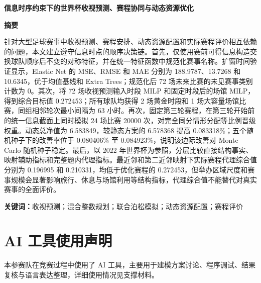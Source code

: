 \documentclass[UTF8,a4paper,11pt,fontset=none]{ctexart}
\begin{document}
\setcounter{page}{1}

\begin{center}
  {\bfseries 信息时序约束下的世界杯收视预测、赛程协同与动态资源优化\par}
\end{center}
\vspace{0.8em}

\begin{center}
  {\bfseries 摘\quad 要}
\end{center}

针对大型足球赛事中收视预测、赛程安排、动态资源配置和实际赛程评价相互依赖的问题，本文建立遵守信息时点的顺序决策链。首先，仅使用赛前可得信息构造交换球队顺序后不变的对称特征，并在统一特征函数中规范化赛事名称。扩窗时间验证显示，Elastic Net 的 MSE、RMSE 和 MAE 分别为 188.9787、13.7268 和 10.6345，优于均值基线和 Extra Trees；规范化后 72 场未来比赛的未见赛事类别计数为 0。其次，将 72 场收视预测输入时段 MILP 和固定时段后的场馆 MILP，得到综合目标值 0.272453；所有球队均获得 2 场黄金时段和 1 场大容量场馆比赛，同组相邻轮次最小间隔为 63 小时。再次，固定第三轮赛程，在第三轮开始前的统一信息截面上同时模拟 24 场比赛 20000 次，对完全同分情形分配等比例晋级权重。动态总净值为 6.583849，较静态方案的 6.578368 提高 0.083318\%；五个随机种子下的改善率位于 0.080406\% 至 0.084923\%，说明该边际改善对 Monte Carlo 随机种子稳定。最后，以 2022 年世界杯为参照，分层比较直接结构事实、映射辅助指标和完整题内代理指标。最近邻和第二近邻映射下实际赛程代理综合值分别为 0.196995 和 0.210331，均低于优化赛程的 0.272453，但举办区域尺度和赛事规模会显著影响旅行、休息与场馆利用等结构指标，代理综合值不能替代对真实赛事的全面评价。

\vspace{0.8em}
\noindent\textbf{关键词：}收视预测；混合整数规划；联合泊松模拟；动态资源配置；赛程评价

\newpage



\section*{AI 工具使用声明}
本参赛队在竞赛过程中使用了 AI 工具，主要用于建模方案讨论、程序调试、结果复核与语言表达整理，详细使用情况见支撑材料。
\end{document}

